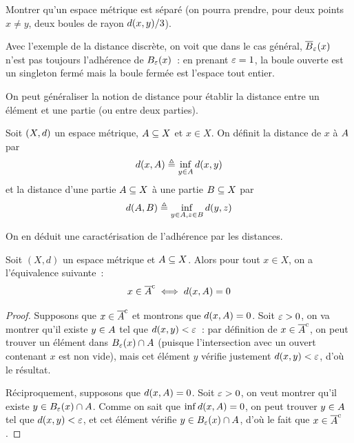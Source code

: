 \begin{exercise}
  Montrer qu'un espace métrique est séparé (on pourra prendre, pour deux points
  $x\neq y$, deux boules de rayon $d(x,y)/3$).
\end{exercise}

\begin{remark}
  Avec l'exemple de la distance discrète, on voit que dans le cas général,
  $\overline{B}_{\varepsilon}(x)$ n'est pas toujours l'adhérence de
  $B_{\varepsilon}(x)$~: en prenant $\varepsilon = 1$, la boule ouverte est un
  singleton fermé mais la boule fermée est l'espace tout entier.
\end{remark}

\noindent
On peut généraliser la notion de distance pour établir la distance entre un
élément et une partie (ou entre deux parties).

\begin{definition}
  Soit $(X,d)$ un espace métrique, $A\subseteq X$ et $x\in X$. On
  définit la distance de $x$ à $A$ par
  \[d(x,A)\triangleq \inf_{y\in A} d(x,y)\]
  et la distance d'une partie $A\subseteq X$ à une partie
  $B\subseteq X$ par
  \[d(A,B)\triangleq \inf_{y\in A, z \in B} d(y,z)\]
\end{definition}

\noindent
On en déduit une caractérisation de l'adhérence par les distances.

\begin{proposition}
  Soit $(X,d)$ un espace métrique et $A\subseteq X$. Alors pour tout
  $x\in X$, on a l'équivalence suivante~:
  \[x\in \overline{A}^{\mathrm c} \iff d(x,A) = 0\]
\end{proposition}

\begin{proof}
  Supposons que $x\in \overline{A}^{\mathrm c}$ et montrons que $d(x,A) = 0$. Soit
  $\varepsilon > 0$, on va montrer qu'il existe $y\in A$ tel que
  $d(x,y)< \varepsilon$~: par définition de $x\in \overline{A}^{\mathrm c}$, on peut
  trouver un élément dans $B_{\varepsilon}(x)\cap A$ (puisque
  l'intersection avec un ouvert contenant $x$ est non vide), mais cet élément
  $y$ vérifie justement $d(x,y) < \varepsilon$, d'où le résultat.

  Réciproquement, supposons que $d(x,A) = 0$. Soit $\varepsilon > 0$, on
  veut montrer qu'il existe $y\in B_{\varepsilon}(x)\cap A$. Comme on sait
  que $\inf d(x,A) = 0$, on peut trouver $y\in A$ tel que
  $d(x,y) <\varepsilon$, et cet élément vérifie
  $y\in B_{\varepsilon}(x)\cap A$, d'où le fait que $x\in \overline{A}^{\mathrm c}$.
\end{proof}

